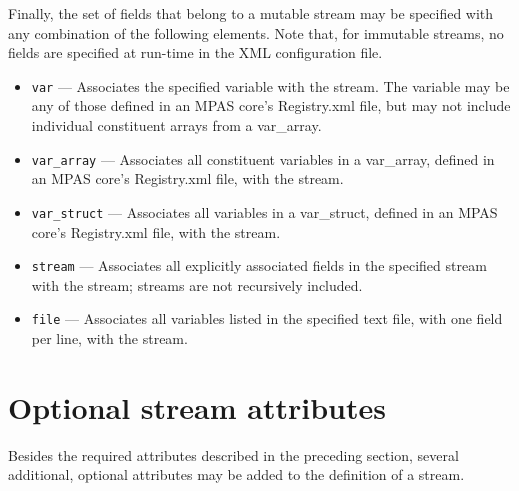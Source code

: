Finally, the set of fields that belong to a mutable stream may be specified with any combination of the following elements. Note that, for 
immutable streams, no fields are specified at run-time in the XML configuration file.

\begin{itemize}
\item {\tt var} --- Associates the specified variable with the stream. The variable may be any of those defined in an MPAS core's Registry.xml file, but may
not include individual constituent arrays from a var\_array.
\item {\tt var\_array} --- Associates all constituent variables in a var\_array, defined in an MPAS core's Registry.xml file, with the stream.
\item {\tt var\_struct} --- Associates all variables in a var\_struct, defined in an MPAS core's Registry.xml file, with the stream.
\item {\tt stream} --- Associates all explicitly associated fields in the specified stream with the stream; streams are not recursively included.
\item {\tt file} --- Associates all variables listed in the specified text file, with one field per line, with the stream.
\end{itemize}

\section{Optional stream attributes}
\label{sec:optional_stream_atts} 

Besides the required attributes described in the preceding section, several additional, optional attributes may be added to
the definition of a stream.

